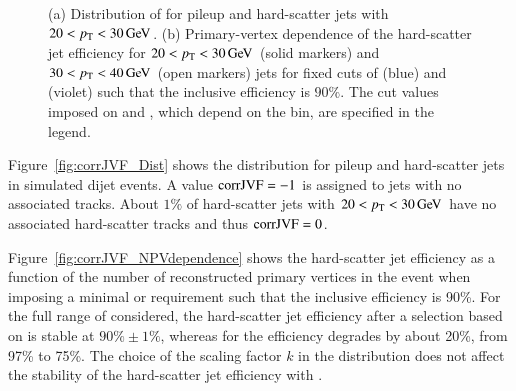 \documentclass{atlasnote}
\begin{document}
\begin{figure}[!htbp]
  \centering
  \caption{(a) Distribution of \cJVF for pileup and hard-scatter jets with $20 < p_{\mathrm{T}} < 30\,\text{Ge\hspace{-.08em}V}$. 
           (b) Primary-vertex dependence of the hard-scatter 
           jet efficiency for $20 < p_{\mathrm{T}} < 30\,\text{Ge\hspace{-.08em}V}$ (solid markers) and $30 < p_{\mathrm{T}} < 40\,\text{Ge\hspace{-.08em}V}$ (open markers) 
           jets for fixed cuts of \cJVF (blue) and \JVF (violet) such that the inclusive efficiency is $90\%$. 
           The cut values imposed on \cJVF and \JVF, which depend on the \pT bin, are specified in the legend.
    }
\label{fig:corrJVF}
\end{figure}


Figure~\ref{fig:corrJVF_Dist} shows the \cJVF distribution for pileup and hard-scatter jets in simulated dijet events. 
A value ${\rm corrJVF}=-1$ is assigned to jets with no associated tracks. About $1\%$ of hard-scatter jets with $20 < p_{\mathrm{T}} < 30 \,\text{Ge\hspace{-.08em}V}$ have no associated hard-scatter tracks and thus ${\rm corrJVF}=0$. 

Figure~\ref{fig:corrJVF_NPVdependence} shows the 
hard-scatter jet efficiency as a function of the number of 
reconstructed primary vertices in the event when imposing a minimal \cJVF or \JVF requirement such that the \NPV inclusive 
efficiency is 90\%.  
For the full range of \NPV considered, the hard-scatter jet efficiency after a selection based on \cJVF is stable at $90\%\pm1\%$, 
whereas for \JVF the efficiency degrades by about 20\%, 
from 97\% to 75\%. The choice of the scaling factor $k$ in the \cJVF distribution does not affect the stability of the hard-scatter jet efficiency with \NPV. 
\end{document}
